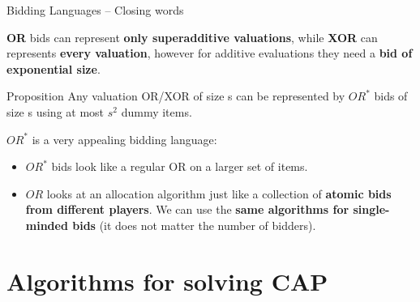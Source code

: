 \documentclass[aspectratio=169,xcolor=dvipsnames]{beamer}
\begin{document}
    \begin{frame}{Bidding Languages – Closing words}

    \textbf{OR} bids can represent \textbf{only superadditive valuations}, while \textbf{XOR} can represents \textbf{every valuation}, however for additive evaluations they need a \textbf{bid of exponential size}.
    \begin{block}{Proposition}
    Any valuation OR/XOR of size s can be represented by $OR^*$ bids of size s using at most $s^2$ dummy items.
    \end{block}
    $OR^*$ is a very appealing bidding language:
    \begin{itemize}
    \item $OR^*$ bids look like a regular OR on a larger set of items.
    \item $OR$ looks at an allocation algorithm just like a collection of \textbf{atomic bids from different players}. We can use the \textbf{same algorithms for single-minded bids} (it does not matter the number of bidders).
    \end{itemize}

\end{frame}



    \section{Algorithms for solving CAP}
\end{document}
